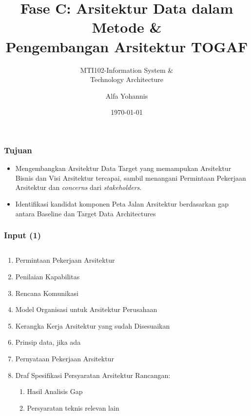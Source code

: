 \documentclass[aspectratio=169, table]{beamer}
\subtitle{MTI102-Information System \&\\Technology Architecture}
\title{Fase C: Arsitektur Data dalam Metode \&\\ Pengembangan Arsitektur TOGAF}
\author{Alfa Yohannis}
\date{\today}
\begin{document}
	
	\frame{\titlepage}
	
	\begin{frame}
		\frametitle{Tujuan}
		\begin{itemize}
			\item Mengembangkan Arsitektur Data Target yang memampukan Arsitektur Bisnis dan Visi Arsitektur tercapai, sambil menangani Permintaan Pekerjaan Arsitektur dan \textit{concerns} dari \textit{stakeholders}.
			\item Identifikasi kandidat komponen Peta Jalan Arsitektur berdasarkan gap antara Baseline dan Target Data Architectures
		\end{itemize}
	\end{frame}
	
	\begin{frame}
		\frametitle{Input (1)}
		\begin{columns}
			\begin{column}{1\textwidth}
				\begin{center}
					\begin{enumerate}
						\item Permintaan Pekerjaan Arsitektur
						\item Penilaian Kapabilitas
						\item Rencana Komunikasi
						\item Model Organisasi untuk Arsitektur Perusahaan
						\item Kerangka Kerja Arsitektur yang sudah Disesuaikan
						\item Prinsip data, jika ada
						\item Pernyataan Pekerjaan Arsitektur
						\item Draf Spesifikasi Persyaratan Arsitektur Rancangan:
						\begin{enumerate}
							\item Hasil Analisis Gap
							\item Persyaratan teknis relevan lain
						\end{enumerate}
					\end{enumerate}
				\end{center}
			\end{column}
			\begin{column}{0.5\textwidth}
				\begin{center}
					\begin{enumerate}
						\setcounter{enumi}{8}
						
					\end{enumerate}
				\end{center}
			\end{column}
		\end{columns}
	\end{frame}
	
\end{document}
